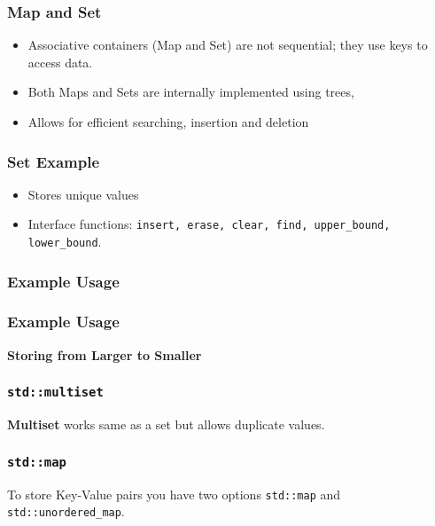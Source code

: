 \begin{frame}
    \frametitle{Map and Set}

    
    \begin{itemize}
        \item Associative containers (Map and Set) are not sequential; they use keys to access data.\pause[]
        \item Both Maps and Sets are internally implemented using trees, \pause[]
        \item Allows for efficient searching, insertion and deletion
    \end{itemize}

\end{frame}

\begin{frame}
    \frametitle{Set Example}

    
    \begin{itemize}
        \item Stores unique values\pause[]
        \item Interface functions: \texttt{insert, erase, clear, find, upper\_bound, lower\_bound}.
    \end{itemize}

\end{frame}

\begin{frame}
    \frametitle{Example Usage}

    

\end{frame}

\begin{frame}
    \frametitle{Example Usage}

    \textbf{Storing from Larger to Smaller}

    

\end{frame}

\begin{frame}
    \frametitle{\texttt{std::multiset}}

    \textbf{Multiset} works same as a set but allows duplicate values.

    

\end{frame}

\begin{frame}
    \frametitle{\texttt{std::map}}

    To store Key-Value pairs you have two options \texttt{std::map} and \texttt{std::unordered\_map}.

\end{frame}

